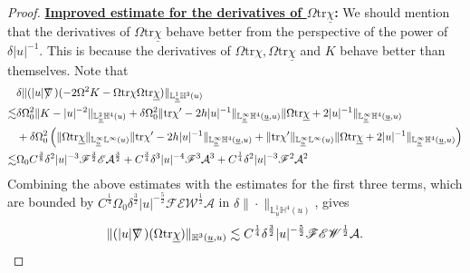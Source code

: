 \documentclass[11pt,reqno]{amsart}
\theoremstyle{definition}
\numberwithin{equation}{section}
\newcommand{\tr}{\mathrm{tr}}
\renewcommand{\L}{\mathbb{L}}
\renewcommand{\H}{\mathbb{H}}
\def\chib{\underline{\chi}}
\def\tr{\mathrm{tr}}
\def\ub{\underline{u}}
\def\nablas{\mbox{$\nabla \mkern -13mu /$ }}
\begin{document}
\begin{proof}
{\bf \underline{Improved estimate for the derivatives of $\Omega\tr\chib$}:}
We should mention that the derivatives of $\Omega\tr\chib$ behave better from the perspective of the power of $\delta|u|^{-1}$.  This is because the derivatives of $\Omega\tr\chi, \Omega\tr\chib$ and $K$ behave better than themselves. Note that
\begin{align*}
&\delta\|(|u|\nablas)(-2\Omega^2K-\Omega\tr\chi\Omega\tr\chib)\|_{\L^1_{\ub}\H^3(u)}\\
\lesssim&\delta\Omega_0^2\|K-|u|^{-2}\|_{\L^2_{\ub}\H^4(u)}+\delta\Omega_0^2\|\tr\chi'-2h|u|^{-1}\|_{\L^\infty_{\ub}\H^4(\ub,u)}\|\Omega\tr\chib+2|u|^{-1}\|_{\L^\infty_{\ub}\H^4(\ub,u)}\\
&+\delta\Omega_0^2\left(\|\Omega\tr\chib\|_{\L^\infty_{\ub}\L^\infty(u)}\|\tr\chi'-2h|u|^{-1}\|_{\L^\infty_{\ub}\H^4(\ub,u)}+\|\tr\chi'\|_{\L^\infty_{\ub}\L^\infty(u)}\|\Omega\tr\chib+2|u|^{-1}\|_{\L^\infty_{\ub}\H^4(\ub,u)}\right)\\
\lesssim&\Omega_0C^{\frac{3}{8}}\delta^2|u|^{-3}\mathscr{F}^{\frac{3}{2}}\mathscr{E}\mathcal{A}^{\frac{3}{2}}+C^{\frac{3}{4}}\delta^3|u|^{-4}\mathscr{F}^3\mathcal{A}^3+C^{\frac{1}{4}}\delta^2|u|^{-3}\mathscr{F}^2\mathcal{A}^2
\end{align*}
Combining the above estimates with the estimates for the first three terms, which are bounded by $C^{\frac{1}{4}}\Omega_0\delta^{\frac{3}{2}}|u|^{-\frac{5}{2}}\mathscr{F}\mathscr{E}\mathscr{W}^{\frac{1}{2}}\mathcal{A}$ in $\delta\|\cdot\|_{\L^1_{\ub}\H^4(u)}$, gives
\begin{align}\label{estimate-detrchib}
\|(|u|\nablas)(\Omega\tr\chib)\|_{\H^3(\ub,u)}\lesssim C^{\frac{1}{4}}\delta^{\frac{3}{2}}|u|^{-\frac{5}{2}}\mathscr{F}\mathscr{E}\mathscr{W}^{\frac{1}{2}}\mathcal{A}.
\end{align}



\end{proof}
\end{document}
